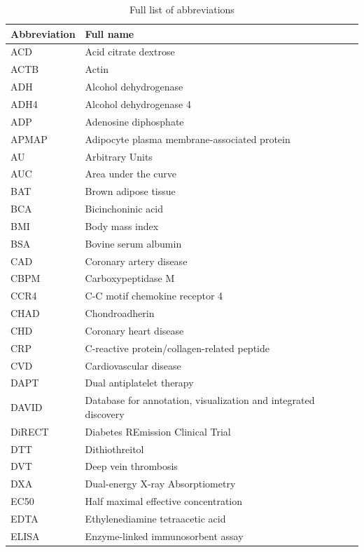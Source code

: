\documentclass[11pt,twoside]{bristolthesis}
\begin{document}
  \listoffigures
  \begin{abbreviations}
    \begin{longtable}[t]{ll}
    \caption{Full list of abbreviations}\\
    \toprule
    Abbreviation & Full name\\
    \midrule
    ACD & Acid citrate dextrose\\
    ACTB & Actin\\
    ADH & Alcohol dehydrogenase\\
    ADH4 & Alcohol dehydrogenase 4\\
    ADP & Adenosine diphosphate\\
    \addlinespace
    APMAP & Adipocyte plasma membrane-associated protein\\
    AU & Arbitrary Units\\
    AUC & Area under the curve\\
    BAT & Brown adipose tissue\\
    BCA & Bicinchoninic acid\\
    \addlinespace
    BMI & Body mass index\\
    BSA & Bovine serum albumin\\
    CAD & Coronary artery disease\\
    CBPM & Carboxypeptidase M\\
    CCR4 & C-C motif chemokine receptor 4\\
    \addlinespace
    CHAD & Chondroadherin\\
    CHD & Coronary heart disease\\
    CRP & C-reactive protein/collagen-related peptide\\
    CVD & Cardiovascular disease\\
    DAPT & Dual antiplatelet therapy\\
    DAVID & Database for annotation, visualization and integrated discovery\\
    \addlinespace
    DiRECT & Diabetes REmission Clinical Trial\\
    DTT & Dithiothreitol\\
    DVT & Deep vein thrombosis\\
    DXA & Dual-energy X-ray Absorptiometry\\
    EC50 & Half maximal effective concentration\\
    \addlinespace
    EDTA & Ethylenediamine tetraacetic acid\\
    ELISA & Enzyme-linked immunosorbent assay\\

\end{longtable}
\end{abbreviations}
\end{document}
